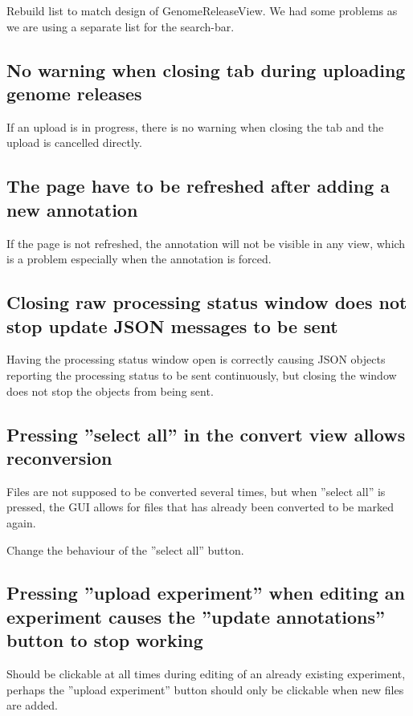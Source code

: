Rebuild list to match design of GenomeReleaseView. We had some problems as we are using a separate list for the search-bar.

\subsection{No warning when closing tab during uploading genome releases}
If an upload is in progress, there is no warning when closing the tab and the upload is cancelled directly.

\subsection{The page have to be refreshed after adding a new annotation}
If the page is not refreshed, the annotation will not be visible in any view,
which is a problem especially when the annotation is forced.

\subsection{Closing raw processing status window does not stop update JSON messages to be sent}
Having the processing status window open is correctly causing JSON objects
reporting the processing status to be sent continuously, but closing the
window does not stop the objects from being sent. 

\subsection{Pressing ''select all'' in the convert view allows reconversion}
Files are not supposed to be converted several times, but when ''select all''
is pressed, the GUI allows for files that has already been converted to be
marked again.

Change the behaviour of the ''select all'' button.

\subsection{Pressing ''upload experiment'' when editing an experiment causes
the ''update annotations'' button to stop working}
Should be clickable at all times during editing of an already existing 
experiment, perhaps the ''upload experiment'' button should only be clickable
when new files are added.


